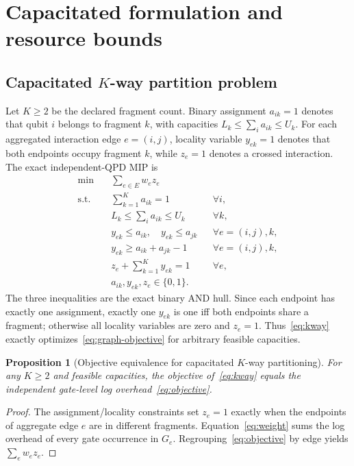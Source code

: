 \documentclass[
  aps,
  pra,
  reprint,
  amsmath,
  amssymb,
  longbibliography,
  nofootinbib,
  floatfix
]{revtex4-2}
\theoremstyle{plain}
\newtheorem{proposition}{Proposition}
\begin{document}
\section{Capacitated formulation and resource bounds}
\label{sec:opt}

\subsection{Capacitated $K$-way partition problem}

Let $K\geq2$ be the declared fragment count. Binary assignment $a_{ik}=1$ denotes that qubit $i$ belongs to fragment $k$, with capacities $L_k\leq\sum_i a_{ik}\leq U_k$. For each aggregated interaction edge $e=(i,j)$, locality variable $y_{ek}=1$ denotes that both endpoints occupy fragment $k$, while $z_e=1$ denotes a crossed interaction. The exact independent-QPD MIP is
\begin{equation}
\begin{aligned}
\min\quad & \sum_{e\in E} w_e z_e\\
\text{s.t.}\quad & \sum_{k=1}^{K} a_{ik}=1 && \forall i,\\
& L_k\leq\sum_i a_{ik}\leq U_k && \forall k,\\
& y_{ek}\leq a_{ik},\quad y_{ek}\leq a_{jk} && \forall e=(i,j),k,\\
& y_{ek}\geq a_{ik}+a_{jk}-1 && \forall e=(i,j),k,\\
& z_e+\sum_{k=1}^{K}y_{ek}=1 && \forall e,\\
& a_{ik},y_{ek},z_e\in\{0,1\}.&
\end{aligned}
\label{eq:kway}
\end{equation}
The three inequalities are the exact binary AND hull. Since each endpoint has exactly one assignment, exactly one $y_{ek}$ is one iff both endpoints share a fragment; otherwise all locality variables are zero and $z_e=1$. Thus~\eqref{eq:kway} exactly optimizes~\eqref{eq:graph-objective} for arbitrary feasible capacities.

\begin{proposition}[Objective equivalence for capacitated $K$-way partitioning]\label{prop:kway-equiv}
For any $K\geq2$ and feasible capacities, the objective of~\eqref{eq:kway} equals the independent gate-level log overhead~\eqref{eq:objective}.
\end{proposition}
\begin{proof}
The assignment/locality constraints set $z_e=1$ exactly when the endpoints of aggregate edge $e$ are in different fragments. Equation~\eqref{eq:weight} sums the log overhead of every gate occurrence in $G_e$. Regrouping~\eqref{eq:objective} by edge yields $\sum_e w_ez_e$.
\end{proof}
\end{document}
